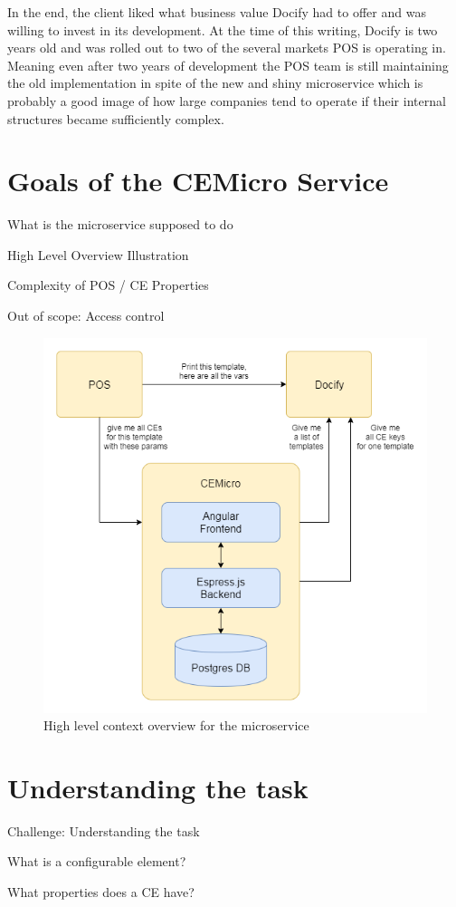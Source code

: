 In the end, the client liked what business value Docify had to offer and was willing to invest in its development. At the time of this writing, Docify is two years old and was rolled out to two of the several markets POS is operating in. Meaning even after two years of development the POS team is still maintaining the old implementation in spite of the new and shiny microservice which is probably a good image of how large companies tend to operate if their internal structures became sufficiently complex.

\section{Goals of the CEMicro Service}

What is the microservice supposed to do

High Level Overview Illustration

Complexity of POS / CE Properties

Out of scope: Access control

\begin{figure}
  \centering
  \includegraphics[width=0.6\linewidth]{assets/high-level-overview.png}
  \caption{High level context overview for the microservice}
  \label{fig:context}
\end{figure}


\section{Understanding the task}
\label{sec:arch:}

Challenge: Understanding the task

What is a configurable element?

What properties does a CE have?

